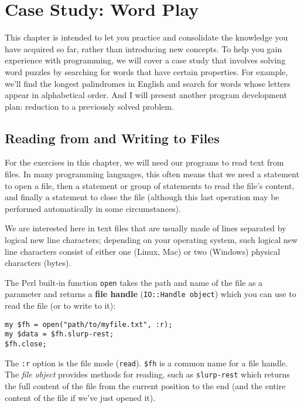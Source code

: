 
\chapter{Case Study: Word Play}
\label{wordplay}

This chapter is intended to let you practice and 
consolidate the knowledge you have acquired so far, 
rather than introducing new concepts. To help you gain 
experience with programming, we will cover a 
case study that involves solving word puzzles by 
searching for words that have certain properties.  
For example, we'll find the longest palindromes
in English and search for words whose letters appear in
alphabetical order.  And I will present another program 
development plan: reduction to a previously solved problem.


\section{Reading from and Writing to Files}

For the exercises in this chapter, we will need our 
programs to read text from files. In many programming 
languages, this often means that we need a statement to 
open a file, then a statement or group of statements to 
read the file's content, and finally a statement to 
close the file (although this last operation may 
be performed automatically in some circumstances).

We are interested here in text files that are usually 
made of lines separated by logical new line characters; 
depending on your operating system, such logical new line 
characters consist of either one (Linux, Mac) or two (Windows) 
physical characters (bytes). 

The Perl built-in function {\tt open} takes the path and 
name of the file as a parameter and returns a {\bf file 
handle} ({\tt IO::Handle object}) which you can use to read 
the file (or to write to it):

\begin{verbatim}
my $fh = open("path/to/myfile.txt", :r);
my $data = $fh.slurp-rest;
$fh.close;
\end{verbatim}
%
The {\tt :r} option is the file mode ({\tt read}). {\tt \$fh} is a 
common name for a file handle.  The \emph{file object} provides methods 
for reading, such as {\tt slurp-rest} which returns the 
full content of the file from the current position to the 
end (and the entire content of the file if we've just 
opened it).

